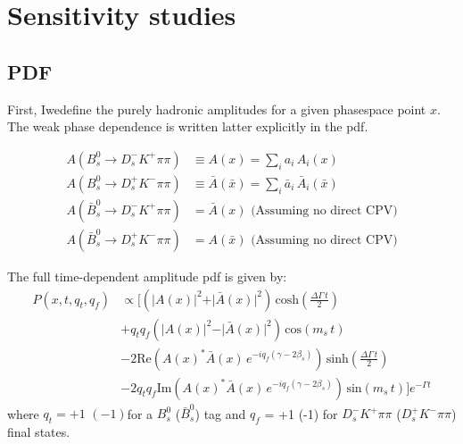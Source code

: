 
\section{Sensitivity studies}


\subsection{PDF}

First, Iwedefine the purely hadronic amplitudes for a given phasespace point $x$.
The weak phase dependence is written latter explicitly in the pdf.


\begin{align}
	A(B_s^0 \to D_s^{-} K^{+} \pi\pi) &\equiv A(x) = \sum_i a_i \, A_i(x)   \\
	A(B_s^0 \to D_s^{+} K^{-} \pi\pi) &\equiv \bar A(\bar x) = \sum_i \bar a_i \,\bar A_i(\bar x)    \\
	A(\bar B_s^0 \to D_s^{-} K^{+} \pi\pi) &= \bar A(x)  \, \, \text{(Assuming no direct CPV)} \\
	A(\bar B_s^0 \to D_s^{+} K^{-} \pi\pi) &= A(\bar x)  \, \, \text{(Assuming no direct CPV)} 
\end{align}

The full time-dependent amplitude pdf is given by:
\begin{equation}
\begin{split}
\label{eq:PDF_full}
	P(x,t,q_t,q_f) &\propto  [
	 \left( \vert A(x) \vert^2 + \vert \bar A(x) \vert^2 \right) \, \text{cosh} \left( \frac{\Delta \Gamma \, t}{2}\right) \\
	 & + q_t q_f \left( \vert A(x) \vert^2 - \vert \bar A(x) \vert^2 \right) \, \text{cos} \left( m_s \, t \right)  \\
	 & -2 \text{Re}\left( A(x)^{*}  \bar A(x) \, e^{-i q_f (\gamma - 2\beta_s)}  \right) \, \text{sinh} \left( \frac{\Delta \Gamma \, t}{2}\right)  \\
	 & -2 q_t q_f \text{Im}\left( A(x)^{*}  \bar A(x) \, e^{-i q_f (\gamma - 2\beta_s)}  \right)\, \text{sin} \left( m_s \, t \right)  ]  e^{- \Gamma t}
\end{split}
\end{equation}
where $q_t = +1$ $(-1) $for a $B_s^{0}$ ($\bar B_s^{0}$) tag and 
$q_f$ = +1 $ $(-1) for $D_s^{-} K^{+} \pi\pi$ ($D_s^{+} K^{-} \pi\pi$) final states. \\

